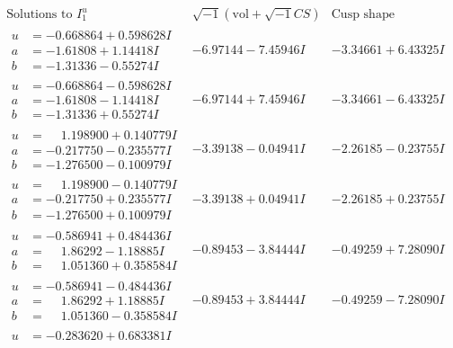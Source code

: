 \documentclass[1p]{elsarticle_modified}
\theoremstyle{definition}
\newcommand{\I}{\sqrt{-1}}
\begin{document}
$$\begin{array}{c|c|c}  
\text{Solutions to }I^u_{1}& \I (\text{vol} + \sqrt{-1}CS) & \text{Cusp shape}\\
 \hline 
\begin{aligned}
u &= -0.668864 + 0.598628 I \\
a &= -1.61808 + 1.14418 I \\
b &= -1.31336 - 0.55274 I\end{aligned}
 & -6.97144 - 7.45946 I & -3.34661 + 6.43325 I \\ \hline\begin{aligned}
u &= -0.668864 - 0.598628 I \\
a &= -1.61808 - 1.14418 I \\
b &= -1.31336 + 0.55274 I\end{aligned}
 & -6.97144 + 7.45946 I & -3.34661 - 6.43325 I \\ \hline\begin{aligned}
u &= \phantom{-}1.198900 + 0.140779 I \\
a &= -0.217750 - 0.235577 I \\
b &= -1.276500 - 0.100979 I\end{aligned}
 & -3.39138 - 0.04941 I & -2.26185 - 0.23755 I \\ \hline\begin{aligned}
u &= \phantom{-}1.198900 - 0.140779 I \\
a &= -0.217750 + 0.235577 I \\
b &= -1.276500 + 0.100979 I\end{aligned}
 & -3.39138 + 0.04941 I & -2.26185 + 0.23755 I \\ \hline\begin{aligned}
u &= -0.586941 + 0.484436 I \\
a &= \phantom{-}1.86292 - 1.18885 I \\
b &= \phantom{-}1.051360 + 0.358584 I\end{aligned}
 & -0.89453 - 3.84444 I & -0.49259 + 7.28090 I \\ \hline\begin{aligned}
u &= -0.586941 - 0.484436 I \\
a &= \phantom{-}1.86292 + 1.18885 I \\
b &= \phantom{-}1.051360 - 0.358584 I\end{aligned}
 & -0.89453 + 3.84444 I & -0.49259 - 7.28090 I \\ \hline\begin{aligned}
u &= -0.283620 + 0.683381 I \\

\end{aligned}
\end{array}$$
\end{document}
